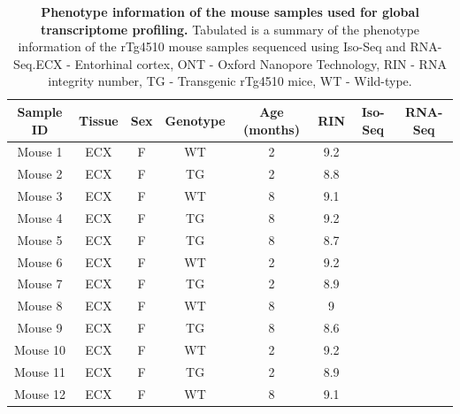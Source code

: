 \vspace{1cm}
\begin{table}[h]
    \setlength\tabcolsep{7pt} %
	\captionsetup{width=0.95\textwidth}
	\caption[Phenotype information of the mouse samples used for global transcriptome profiling]%
	{\textbf{Phenotype information of the mouse samples used for global transcriptome profiling.} Tabulated is a summary of the phenotype information of the rTg4510 mouse samples sequenced using Iso-Seq and RNA-Seq.\newline ECX - Entorhinal cortex, ONT - Oxford Nanopore Technology, RIN - RNA integrity number, TG - Transgenic rTg4510 mice, WT - Wild-type.}
	\label{tab:whole_phenotype}
	\centering
	\begin{tabular}{@{}cccccccc@{}}
		\toprule
		Sample ID & Tissue & Sex & Genotype & Age (months) & RIN & Iso-Seq & RNA-Seq  \\ \midrule
		Mouse 1   & ECX    & F   & WT       & 2         & 9.2 & \checkmark       &  \checkmark         \\
		Mouse 2   & ECX    & F   & TG       & 2         & 8.8 & \checkmark        & \checkmark        \\
		Mouse 3   & ECX    & F   & WT       & 8         & 9.1 & \checkmark        & \checkmark        \\
		Mouse 4   & ECX    & F   & TG       & 8         & 9.2 & \checkmark        & \checkmark        \\
		Mouse 5   & ECX    & F   & TG       & 8         & 8.7 & \checkmark        & \checkmark        \\
		Mouse 6   & ECX    & F   & WT       & 2         & 9.2 & \checkmark        & \checkmark        \\
		Mouse 7   & ECX    & F   & TG       & 2         & 8.9 & \checkmark        & \checkmark        \\
		Mouse 8   & ECX    & F   & WT       & 8         & 9   & \checkmark        & \checkmark       \\
		Mouse 9   & ECX    & F   & TG       & 8         & 8.6 & \checkmark        & \checkmark        \\
		Mouse 10  & ECX    & F   & WT       & 2         & 9.2 & \checkmark        & \checkmark        \\
		Mouse 11  & ECX    & F   & TG       & 2         & 8.9 & \checkmark        & \checkmark       \\
		Mouse 12  & ECX    & F   & WT       & 8         & 9.1 & \checkmark        & \checkmark        \\ \bottomrule
	\end{tabular}
\end{table}


